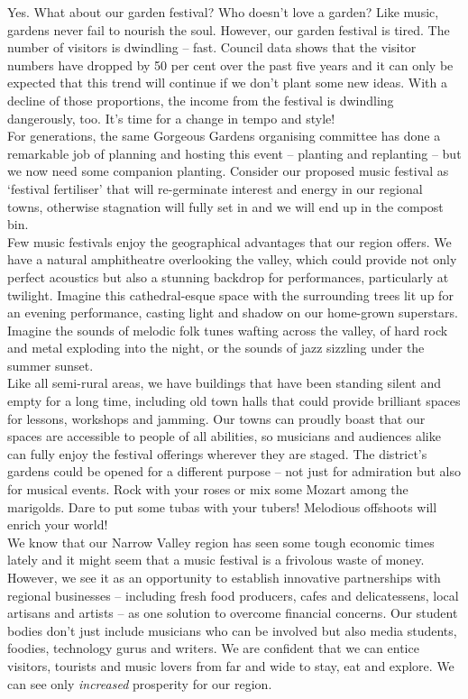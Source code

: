 \documentclass[a4paper]{article}
\begin{document}
Yes. What about our garden festival? Who doesn’t love a garden? Like music, gardens never fail to nourish the soul. However, our garden festival is tired. The number of visitors is dwindling – fast. Council data shows that the visitor numbers have dropped by 50 per cent over the past five years and it can only be expected that this trend will continue if we don’t plant some new ideas. With a decline of those proportions, the income from the festival is dwindling dangerously, too. It’s time for a change in tempo and style!\\

For generations, the same Gorgeous Gardens organising committee has done a remarkable job of planning and hosting this event – planting and replanting – but we now need some companion planting. Consider our proposed music festival as ‘festival fertiliser’ that will re-germinate interest and energy in our regional towns, otherwise stagnation will fully set in and we will end up in the compost bin.\\

Few music festivals enjoy the geographical advantages that our region offers. We have a natural amphitheatre overlooking the valley, which could provide not only perfect acoustics but also a stunning backdrop for performances, particularly at twilight. Imagine this cathedral-esque space with the surrounding trees lit up for an evening performance, casting light and shadow on our home-grown superstars. Imagine the sounds of melodic folk tunes wafting across the valley, of hard rock and metal exploding into the night, or the sounds of jazz sizzling under the summer sunset.\\

Like all semi-rural areas, we have buildings that have been standing silent and empty for a long time, including old town halls that could provide brilliant spaces for lessons, workshops and jamming. Our towns can proudly boast that our spaces are accessible to people of all abilities, so musicians and audiences alike can fully enjoy the festival offerings wherever they are staged. The district’s gardens could be opened for a different purpose – not just for admiration but also for musical events. Rock with your roses or mix some Mozart among the marigolds. Dare to put some tubas with your tubers! Melodious offshoots will enrich your world!\\

We know that our Narrow Valley region has seen some tough economic times lately and it might seem that a music festival is a frivolous waste of money. However, we see it as an opportunity to establish innovative partnerships with regional businesses – including fresh food producers, cafes and delicatessens, local artisans and artists – as one solution to overcome financial concerns. Our student bodies don’t just include musicians who can be involved but also media students, foodies, technology gurus and writers. We are confident that we can entice visitors, tourists and music lovers from far and wide to stay, eat and explore. We can see only \textit{increased} prosperity for our region.\\
\end{document}
